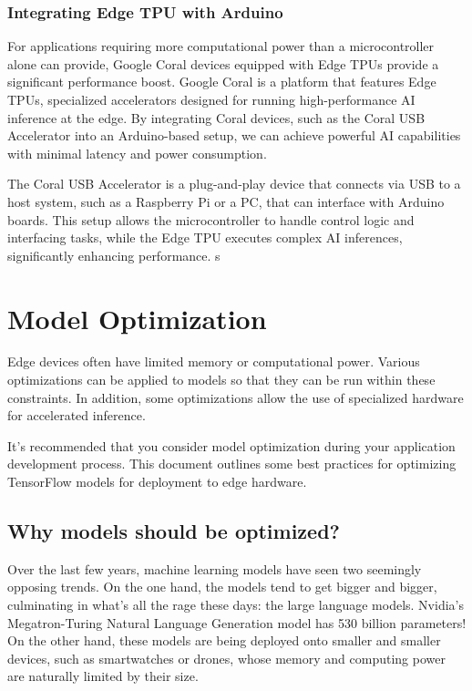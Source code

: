 \subsection{Integrating Edge TPU with Arduino}
For applications requiring more computational power than a microcontroller alone can provide, Google Coral devices equipped with Edge TPUs provide a significant performance boost. Google Coral is a platform that features Edge TPUs, specialized accelerators designed for running high-performance AI inference at the edge. By integrating Coral devices, such as the Coral USB Accelerator into an Arduino-based setup, we can achieve powerful AI capabilities with minimal latency and power consumption. \cite{Coralai_doc:2024}

The Coral USB Accelerator is a plug-and-play device that connects via USB to a host system, such as a Raspberry Pi or a PC, that can interface with Arduino boards. This setup allows the microcontroller to handle control logic and interfacing tasks, while the Edge TPU executes complex AI inferences, significantly enhancing performance.
s

\chapter{Model Optimization}
\label{sec:model_optimization}
Edge devices often have limited memory or computational power. Various optimizations can be applied to models so that they can be run within these constraints. In addition, some optimizations allow the use of specialized hardware for accelerated inference.

It's recommended that you consider model optimization during your application development process. This document outlines some best practices for optimizing TensorFlow models for deployment to edge hardware.

\section{Why models should be optimized?}
Over the last few years, machine learning models have seen two seemingly opposing trends. On the one hand, the models tend to get bigger and bigger, culminating in what’s all the rage these days: the large language models. Nvidia’s Megatron-Turing Natural Language Generation model has 530 billion parameters! On the other hand, these models are being deployed onto smaller and smaller devices, such as smartwatches or drones, whose memory and computing power are naturally limited by their size.

